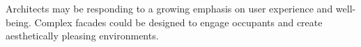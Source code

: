 

 Architects may be responding to a growing emphasis on user experience and well-being.
 Complex facades could be designed to engage occupants and create aesthetically pleasing environments.


